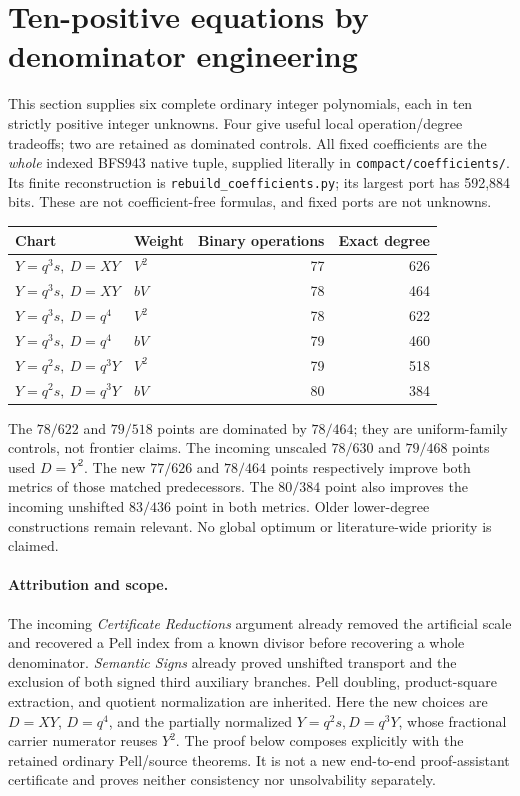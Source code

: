 \section{Ten-positive equations by denominator engineering}\label{sec:compact}
This section supplies six complete ordinary integer polynomials, each in ten
strictly positive integer unknowns. Four give useful local operation/degree
tradeoffs; two are retained as dominated controls. All fixed coefficients are
the \emph{whole} indexed BFS943 native tuple, supplied literally in
\texttt{compact/coefficients/}. Its finite reconstruction is
\texttt{rebuild\_coefficients.py}; its largest port has 592,884 bits.
These are not coefficient-free formulas, and fixed ports are not unknowns.

\begin{center}
\begin{tabular}{llrr}
Chart & Weight & Binary operations & Exact degree\\\hline
$Y=q^3s,\ D=XY$ & $V^2$ &77&626\\
$Y=q^3s,\ D=XY$ & $bV$ &78&464\\
$Y=q^3s,\ D=q^4$ & $V^2$ &78&622\\
$Y=q^3s,\ D=q^4$ & $bV$ &79&460\\
$Y=q^2s,\ D=q^3Y$ & $V^2$ &79&518\\
$Y=q^2s,\ D=q^3Y$ & $bV$ &80&384
\end{tabular}
\end{center}
The $78/622$ and $79/518$ points are dominated by $78/464$; they are
uniform-family controls, not frontier claims. The incoming unscaled
$78/630$ and $79/468$ points used $D=Y^2$. The new $77/626$ and $78/464$
points respectively improve both metrics of those matched predecessors.
The $80/384$ point also improves the incoming unshifted $83/436$ point
in both metrics. Older lower-degree constructions remain relevant.
No global optimum or literature-wide priority is claimed.

\paragraph{Attribution and scope.}
The incoming \emph{Certificate Reductions} argument already removed the
artificial scale and recovered a Pell index from a known divisor before
recovering a whole denominator. \emph{Semantic Signs} already proved
unshifted transport and the exclusion of both signed third auxiliary
branches. Pell doubling, product-square extraction, and quotient
normalization are inherited. Here the new choices are $D=XY$, $D=q^4$,
and the partially normalized $Y=q^2s,D=q^3Y$, whose fractional carrier
numerator reuses $Y^2$. The proof below composes explicitly with the
retained ordinary Pell/source theorems. It is not a new end-to-end
proof-assistant certificate and proves neither consistency nor
unsolvability separately.

